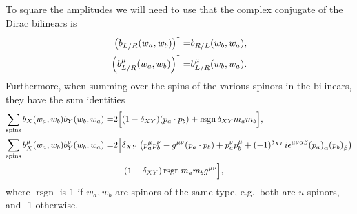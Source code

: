 \documentclass[../main.tex]{subfiles}
\begin{document}
To square the amplitudes we will need to use that the complex conjugate of the Dirac bilinears is
\begin{subequations}
  \label{pc:eq:bilinear_conjugate}
  \begin{align}
    \left(b_{L/R}(w_a, w_b)\right)^\dagger =     & b_{R/L}(w_b, w_a),
    \\
    \left(b_{L/R}^\mu(w_a, w_b)\right)^\dagger = & b_{L/R}^\mu(w_b,
    w_a).
  \end{align}
\end{subequations}
Furthermore, when summing over the spins of the various spinors in the
bilinears, they have the sum identities
\begin{align}
  \label{pc:eq:scalar_bilinear_trace}
  \sum_{\text{spins}} b_X(w_a, w_b) b_Y(w_b, w_a) =         & 2 \Big[
    (1-\delta_{XY}) (p_a \cdot p_b) + \operatorname{rsgn}
    \delta_{XY} m_a m_b
    \Big],
  \\
  \nonumber
  \label{pc:eq:vector_bilinear_trace}
  \sum_{\text{spins}} b_X^\mu(w_a, w_b) b_Y^\nu(w_b, w_a) = & 2\Big[
    \delta_{XY}\pclosed{p_a^\mu p_b^\nu - \g (p_a \cdot p_b) +
      p_a^\nu
      p_b^\mu +
      (-1)^{\delta_{XL}} i \epsilon^{\mu\nu\alpha\beta}
      \tensor{(p_a)}{_\alpha}
  \tensor{(p_b)}{_\beta}}                                             \\
                                                            & +
    (1-\delta_{XY})\operatorname{rsgn} m_a m_b \g \Big],
\end{align}
where \(\operatorname{rsgn}\) is 1 if \(w_a, w_b\) are spinors of the same
type, e.g.\ both are \(u\)-spinors, and -1 otherwise.
\end{document}

